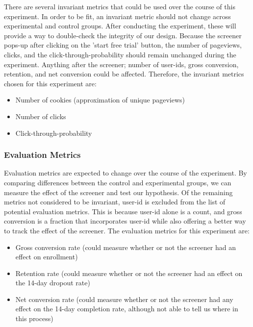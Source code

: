 \documentclass[paper=a4, fontsize=11pt]{scrartcl} %
\numberwithin{equation}{section} %
\numberwithin{figure}{section} %
\numberwithin{table}{section} %
\begin{document}
There are several invariant metrics that could be used over the course of this experiment.  In order to be fit, an invariant metric should not change across experimental and control groups.  After conducting the experiment, these will provide a way to double-check the integrity of our design.  Because the screener pops-up after clicking on the 'start free trial' button, the number of pageviews, clicks, and the click-through-probability should remain unchanged during the experiment.  Anything after the screener; number of user-id\textquotesingle s, gross conversion, retention, and net conversion could be affected.  Therefore, the invariant metrics chosen for this experiment are:

\begin{itemize}
	\item Number of cookies (approximation of unique pageviews)
	\item Number of clicks
	\item Click-through-probability
\end{itemize}


\subsubsection{Evaluation Metrics}

Evaluation metrics are expected to change over the course of the experiment.  By comparing differences between the control and experimental groups, we can measure the effect of the screener and test our hypothesis.  Of the remaining metrics not considered to be invariant, user-id is excluded from the list of potential evaluation metrics.  This is because user-id alone is a count, and gross conversion is a fraction that incorporates user-id while also offering a better way to track the effect of the screener.  The evaluation metrics for this experiment are: 

\begin{itemize}
	\item Gross conversion rate (could measure whether or not the screener had an effect on enrollment)
	\item Retention rate (could measure whether or not the screener had an effect on the 14-day dropout rate)
	\item Net conversion rate (could measure whether or not the screener had any effect on the 14-day completion rate, although not able to tell us where in this process)
\end{itemize}
\end{document}
